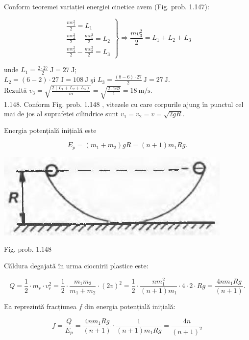 \documentclass[10pt]{article}
\begin{document}
Conform teoremei variației energiei cinetice avem (Fig. prob. 1.147):

$$
\left.\begin{array}{l}
\frac{m v_{1}^{2}}{2}=L_{1} \\
\frac{m v_{2}^{2}}{2}-\frac{m v_{1}^{2}}{2}=L_{2} \\
\frac{m v_{3}^{2}}{2}-\frac{m v_{2}^{2}}{2}=L_{3}
\end{array}\right\} \Rightarrow \frac{m v_{3}^{2}}{2}=L_{1}+L_{2}+L_{3}
$$

unde $L_{1}=\frac{2 \cdot 27}{2} \mathrm{~J}=27 \mathrm{~J}$;\\
$L_{2}=(6-2) \cdot 27 \mathrm{~J}=108 \mathrm{~J}$ şi $L_{3}=\frac{(8-6) \cdot 27}{2} \mathrm{~J}=27 \mathrm{~J}$.\\
Rezultă $v_{3}=\sqrt{\frac{2\left(L_{1}+L_{2}+L_{3}\right)}{m}}=\sqrt{\frac{2 \cdot 162}{1}}=18 \mathrm{~m} / \mathrm{s}$.\\
1.148. Conform Fig. prob. 1.148 , vitezele cu care corpurile ajung în punctul cel mai de jos al suprafeței cilindrice sunt $v_{1}=v_{2}=v=\sqrt{2 g R}$.

Energia potențială inițială este

$$
E_{p}=\left(m_{1}+m_{2}\right) g R=(n+1) m_{1} R g .
$$

\begin{center}
\includegraphics[max width=\textwidth]{2025_07_01_5b3ff9fa0d508c8e9f17g-229(1)}
\end{center}

Fig. prob. 1.148

Căldura degajată în urma ciocnirii plastice este:

$$
Q=\frac{1}{2} \cdot m_{r} \cdot v_{r}^{2}=\frac{1}{2} \cdot \frac{m_{1} m_{2}}{m_{1}+m_{2}} \cdot(2 v)^{2}=\frac{1}{2} \cdot \frac{n m_{1}^{2}}{(n+1) m_{1}} \cdot 4 \cdot 2 \cdot R g=\frac{4 n m_{1} R g}{(n+1)} .
$$

Ea reprezintă fracțiunea $f$ din energia potențială inițială:

$$
f=\frac{Q}{E_{p}}=\frac{4 n m_{1} R g}{(n+1)} \cdot \frac{1}{(n+1) m_{1} R g}=\frac{4 n}{(n+1)^{2}}
$$
\end{document}
